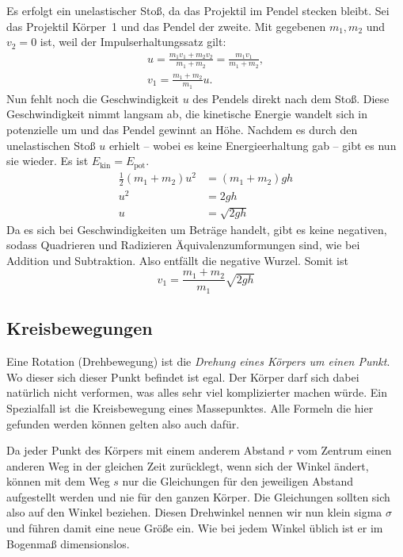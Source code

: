 \documentclass[a4paper,10pt,fleqn,twocolumn,twoside]{article}
\begin{document}
Es erfolgt ein unelastischer Stoß, da das Projektil im Pendel stecken
bleibt. Sei das Projektil Körper~1 und das Pendel der zweite.
Mit gegebenen \(m_1, m_2\) und \(v_2=0\) ist, weil der
Impulserhaltungssatz gilt:
\begin{gather*}
u = \frac{m_1 v_1 + m_2 v_2}{m_1 + m_2} = \frac{m_1 v_1}{m_1 + m_2},\\
v_1 = \frac{m_1 + m_2}{m_1} u.
\end{gather*}
%
Nun fehlt noch die Geschwindigkeit \(u\) des Pendels direkt nach
dem Stoß. Diese Geschwindigkeit nimmt langsam ab, die kinetische
Energie wandelt sich in potenzielle um und das Pendel gewinnt an
Höhe. Nachdem es durch den unelastischen Stoß \(u\) erhielt -- wobei
es keine Energieerhaltung gab -- gibt es nun sie wieder.
Es ist \(E_\text{kin} = E_\text{pot}\).
\begin{align*}
\frac{1}{2}(m_1+m_2) u^2 &= (m_1+m_2)gh\\
u^2 &= 2gh\\
u &= \sqrt{2gh}
\end{align*}
Da es sich bei Geschwindigkeiten um Beträge handelt, gibt es keine
negativen, sodass Quadrieren und Radizieren Äquivalenzumformungen
sind, wie bei Addition und Subtraktion. Also entfällt die negative
Wurzel. Somit ist
\[v_1 = \frac{m_1+m_2}{m_1} \sqrt{2gh}\]

\subsection{Kreisbewegungen}


Eine Rotation (Drehbewegung) ist die \textit{Drehung eines Körpers
um einen Punkt}. Wo dieser sich dieser Punkt befindet ist egal.
Der Körper darf sich dabei natürlich nicht verformen, was alles
sehr viel komplizierter machen würde. Ein Spezialfall ist die
Kreisbewegung eines Massepunktes. Alle Formeln die hier gefunden
werden können gelten also auch dafür.

Da jeder Punkt des Körpers mit einem anderem Abstand \(r\) vom
Zentrum einen anderen Weg in der gleichen Zeit zurücklegt, wenn
sich der Winkel ändert, können mit dem Weg \(s\) nur die Gleichungen
für den jeweiligen Abstand aufgestellt werden und nie für den
ganzen Körper. Die Gleichungen sollten sich also auf den Winkel
beziehen. Diesen Drehwinkel nennen wir nun klein sigma \(\sigma\)
und führen damit eine neue Größe ein. Wie bei jedem Winkel
üblich ist er im Bogenmaß dimensionslos.
\end{document}
